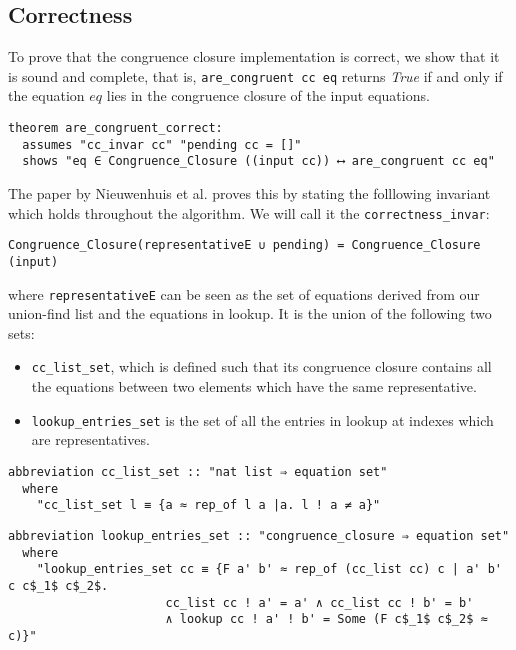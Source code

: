 \subsection{Correctness}
\label{subsection:uf-correctness}

To prove that the congruence closure implementation is correct, we show that it is sound and complete,
that is, \lstinline{are_congruent cc eq} returns \emph{True} if and only if the equation $eq$ lies in the congruence closure of the input equations.

\begin{lstlisting}
theorem are_congruent_correct:
  assumes "cc_invar cc" "pending cc = []"
  shows "eq ∈ Congruence_Closure ((input cc)) ⟷ are_congruent cc eq"
\end{lstlisting}

The paper by Nieuwenhuis et al. \cite{Nieuwenhuis} proves this by stating the folllowing invariant which holds throughout the algorithm. We will call it the \lstinline|correctness_invar|:

\begin{lstlisting}
Congruence_Closure(representativeE ∪ pending) = Congruence_Closure (input)
\end{lstlisting}

where \lstinline{representativeE} can be seen as the set of equations derived from our union-find list and the equations in lookup. It is the union of the following two sets:

\begin{itemize}
    \item\lstinline{cc_list_set}, which is defined such that its congruence closure contains all the equations between two elements which have the same representative.
    \item\lstinline{lookup_entries_set} is the set of all the entries in lookup at indexes which are representatives.
\end{itemize}

\begin{lstlisting}
abbreviation cc_list_set :: "nat list ⇒ equation set"
  where
    "cc_list_set l ≡ {a ≈ rep_of l a |a. l ! a ≠ a}"
\end{lstlisting}

\begin{lstlisting}
abbreviation lookup_entries_set :: "congruence_closure ⇒ equation set"
  where
    "lookup_entries_set cc ≡ {F a' b' ≈ rep_of (cc_list cc) c | a' b' c c$_1$ c$_2$.
                      cc_list cc ! a' = a' ∧ cc_list cc ! b' = b'
                      ∧ lookup cc ! a' ! b' = Some (F c$_1$ c$_2$ ≈ c)}"
\end{lstlisting}

